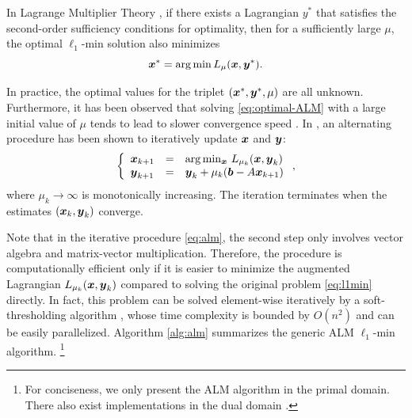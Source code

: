 \documentclass[10pt,twocolumn,letterpaper]{article}
\begin{document}
In Lagrange Multiplier Theory \cite{BertsekasD2003}, if there exists a Lagrangian $y^*$ that
satisfies the second-order sufficiency conditions for optimality, then for a sufficiently large $\mu$, the optimal
$\ell_1$-min solution also minimizes
\begin{equation}
{\boldsymbol{x}}^* = \arg \min L_\mu({\boldsymbol{x}},{\boldsymbol{y}}^*).
\label{eq:optimal-ALM}
\end{equation}

In practice, the optimal values for the triplet $({\boldsymbol{x}}^*, {\boldsymbol{y}}^*, \mu)$ are all
unknown. Furthermore, it has been observed that solving
\eqref{eq:optimal-ALM} with a large initial value of $\mu$ tends to lead to
slower convergence speed \cite{WrightS2008,YangA2010-ICIP}. In
\cite{BertsekasD2003,YangJ2009}, an alternating procedure has been shown to
iteratively update ${\boldsymbol{x}}$ and ${\boldsymbol{y}}$:
\begin{equation}
\left \{
\begin{array}{lll}
{\boldsymbol{x}}_{k+1} & = & \arg\min_{{\boldsymbol{x}}} \, L_{\mu_k} ({\boldsymbol{x}},{\boldsymbol{y}}_k)\\
{\boldsymbol{y}}_{k+1} & = & {\boldsymbol{y}}_k + \mu_k ({\boldsymbol{b}} - A{\boldsymbol{x}}_{k+1}) \\
\end{array}
\right . ,
\label{eq:alm}
\end{equation}
where $\mu_{k}\rightarrow \infty$ is monotonically increasing.
The iteration terminates when the estimates $({\boldsymbol{x}}_k, {\boldsymbol{y}}_k)$ converge.

Note that in the iterative procedure \eqref{eq:alm}, the second
step only involves vector algebra and matrix-vector multiplication. Therefore,
the procedure is computationally efficient only if it is easier to minimize the
augmented Lagrangian $L_{\mu_k} ({\boldsymbol{x}},{\boldsymbol{y}}_k)$ compared to solving the original problem
\eqref{eq:l1min} directly. In fact, this problem can be solved element-wise
iteratively by a soft-thresholding algorithm \cite{WrightS2008,BeckA2009},
whose time complexity is bounded by $O(n^2)$ and can be easily parallelized.
Algorithm \ref{alg:alm} summarizes the generic ALM $\ell_1$-min algorithm. \footnote{For conciseness, we
only present the ALM algorithm in the primal domain. There also
exist implementations in the dual domain \cite{YangJ2009,YangA2010-ICIP}.}
\end{document}

